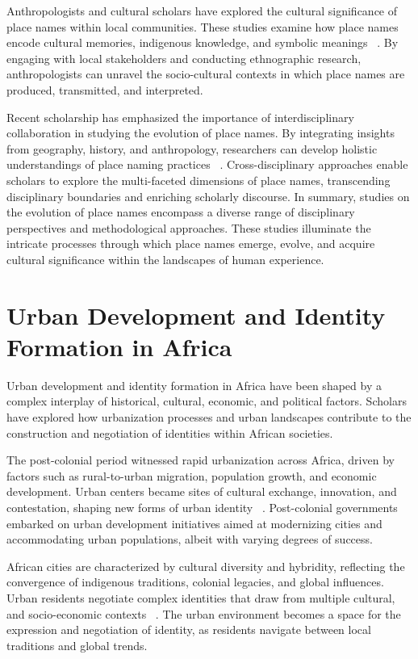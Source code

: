 Anthropologists and cultural scholars have explored the cultural significance of place names within local communities. These studies examine how place names encode cultural memories, indigenous knowledge, and symbolic meanings ~\cite{Gelling}. By engaging with local stakeholders and conducting ethnographic research, anthropologists can unravel the socio-cultural contexts in which place names are produced, transmitted, and interpreted.

Recent scholarship has emphasized the importance of interdisciplinary collaboration in studying the evolution of place names. By integrating insights from geography, history, and anthropology, researchers can develop holistic understandings of place naming practices ~\cite{Bolstad}. Cross-disciplinary approaches enable scholars to explore the multi-faceted dimensions of place names, transcending disciplinary boundaries and enriching scholarly discourse. In summary, studies on the evolution of place names encompass a diverse range of disciplinary perspectives and methodological approaches. These studies illuminate the intricate processes through which place names emerge, evolve, and acquire cultural significance within the landscapes of human experience.

\section{Urban Development and Identity Formation in Africa}
Urban development and identity formation in Africa have been shaped by a complex interplay of historical, cultural, economic, and political factors. Scholars have explored how urbanization processes and urban landscapes contribute to the construction and negotiation of identities within African societies.

The post-colonial period witnessed rapid urbanization across Africa, driven by factors such as rural-to-urban migration, population growth, and economic development. Urban centers became sites of cultural exchange, innovation, and contestation, shaping new forms of urban identity ~\cite{Onilude}. Post-colonial governments embarked on urban development initiatives aimed at modernizing cities and accommodating urban populations, albeit with varying degrees of success.

African cities are characterized by cultural diversity and hybridity, reflecting the convergence of indigenous traditions, colonial legacies, and global influences. Urban residents negotiate complex identities that draw from multiple cultural, and socio-economic contexts ~\cite{Onilude}. The urban environment becomes a space for the expression and negotiation of identity, as residents navigate between local traditions and global trends.

